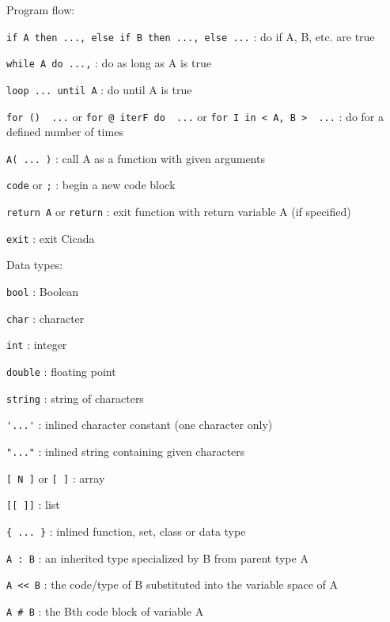 \documentclass{article}
\begin{document}
\noindent
Program flow:
\begin{description}
\item{\verb#if A then ..., else if B then ..., else ...#} :  do if A, B, etc. are true
\item{\verb#while A do ...,#} :  do as long as A is true
\item{\verb#loop ... until A#} :  do until A is true
\item{\verb#for ()  ...# or \verb#for @ iterF do  ...# or \verb#for I in < A, B >  ...#} :  do for a defined number of times
\item{\verb#A( ... )#} :  call A as a function with given arguments
\item{\verb#code#} or \verb#;# :  begin a new code block
\item{\verb#return A#  or  \verb#return#} :  exit function with return variable A (if specified)
\item{\verb#exit#} :  exit Cicada\\
\end{description}

\noindent
Data types:
\begin{description}
\item{\verb#bool#} :  Boolean
\item{\verb#char#} :  character
\item{\verb#int#} :  integer
\item{\verb#double#} :  floating point
\item{\verb#string#} :  string of characters
\item{\verb#'...'#} :  inlined character constant (one character only)
\item{\verb#"..."#} :  inlined string containing given characters
\item{\verb#[ N ]#} or \verb#[ ]# :  array
\item{\verb#[[ ]]#} :  list
\item{\verb#{ ... }#} :  inlined function, set, class or data type
\item{\verb#A : B#} :  an inherited type specialized by B from parent type A
\item{\verb#A << B#} :  the code/type of B substituted into the variable space of A
\item{\verb$A # B$} :  the Bth code block of variable A\\
\end{description}
\end{document}
